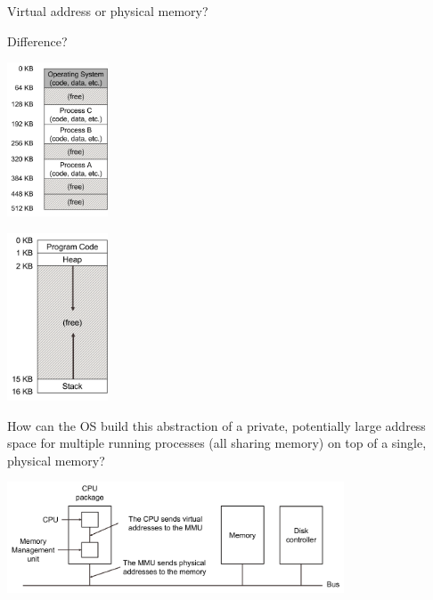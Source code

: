 \begin{slide}

    
    \inputminted{c}{memory-exp.c}
    \bigskip

    Virtual address or physical memory?
    
\end{slide}

\begin{slide}


    Difference?
    \medskip

    \begin{minipage}{0.3\textwidth}
        \includegraphics[width=30mm]{multi-process-mem.png}
    \end{minipage}
    \hspace{10mm}
    \begin{minipage}{0.3\textwidth}
        \includegraphics[width=30mm]{address-space-segments.png}
    \end{minipage}
    \medskip

    How can the OS build this abstraction of a private, potentially large address space for multiple running processes (all sharing memory) on top of a single, physical memory?

\end{slide}

\begin{slide}

	
	\includegraphics[width=100mm]{mmu.png}

\end{slide}

